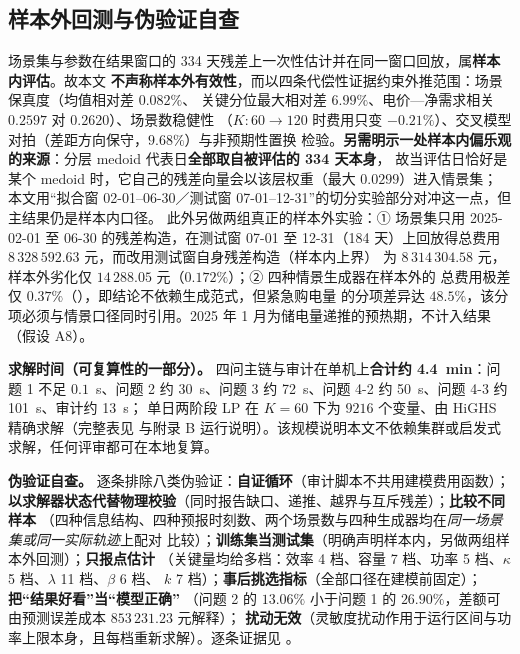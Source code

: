 \subsection{样本外回测与伪验证自查}\label{sec:oos}

场景集与参数在结果窗口的 334 天残差上一次性估计并在同一窗口回放，属\textbf{样本内评估}。故本文
\textbf{不声称样本外有效性}，而以四条代偿性证据约束外推范围：场景保真度（均值相对差 \(0.082\%\)、
关键分位最大相对差 \(6.99\%\)、电价—净需求相关 \(0.2597\) 对 \(0.2620\)）、场景数稳健性
（\(K:60\to120\) 时费用只变 \(-0.21\%\)）、交叉模型对拍（差距方向保守，\(9.68\%\)）与非预期性置换
检验。\textbf{另需明示一处样本内偏乐观的来源}：分层 medoid 代表日\textbf{全部取自被评估的 334 天本身}，
故当评估日恰好是某个 medoid 时，它自己的残差向量会以该层权重（最大 \(0.0299\)）进入情景集；
本文用“拟合窗 02-01--06-30／测试窗 07-01--12-31”的切分实验部分对冲这一点，但主结果仍是样本内口径。
此外另做两组真正的样本外实验：① 场景集只用 2025-02-01 至 06-30 的残差构造，在测试窗
07-01 至 12-31（184 天）上回放得总费用 \(8\,328\,592.63\) 元，而改用测试窗自身残差构造（样本内上界）
为 \(8\,314\,304.58\) 元，样本外劣化仅 \(14\,288.05\) 元（\(0.172\%\)）；② 四种情景生成器在样本外的
总费用极差仅 \(0.37\%\)（），即结论不依赖生成范式，但紧急购电量
的分项差异达 \(48.5\%\)，该分项必须与情景口径同时引用。2025 年 1 月为储电量递推的预热期，不计入结果
（假设 A8）。

\textbf{求解时间（可复算性的一部分）。} 四问主链与审计在单机上\textbf{合计约 4.4~min}：问题 1 不足
\(0.1\)~s、问题 2 约 30~s、问题 3 约 72~s、问题 4-2 约 50~s、问题 4-3 约 101~s、审计约 13~s；
单日两阶段 LP 在 \(K=60\) 下为 \(9216\) 个变量、由 HiGHS 精确求解（完整表见
与附录 B 运行说明）。该规模说明本文不依赖集群或启发式
求解，任何评审都可在本地复算。

\textbf{伪验证自查。} 逐条排除八类伪验证：\textbf{自证循环}（审计脚本不共用建模费用函数）；
\textbf{以求解器状态代替物理校验}（同时报告缺口、递推、越界与互斥残差）；\textbf{比较不同样本}
（四种信息结构、四种预报时刻数、两个场景数与四种生成器均在\emph{同一场景集或同一实际轨迹}上配对
比较）；\textbf{训练集当测试集}（明确声明样本内，另做两组样本外回测）；\textbf{只报点估计}
（关键量均给多档：效率 4 档、容量 7 档、功率 5 档、\(\kappa\) 5 档、\(\lambda\) 11 档、\(\beta\) 6 档、
\(k\) 7 档）；\textbf{事后挑选指标}（全部口径在建模前固定）；\textbf{把“结果好看”当“模型正确”}
（问题 2 的 \(13.06\%\) 小于问题 1 的 \(26.90\%\)，差额可由预测误差成本 \(853\,231.23\) 元解释）；
\textbf{扰动无效}（灵敏度扰动作用于运行区间与功率上限本身，且每档重新求解）。逐条证据见
。

